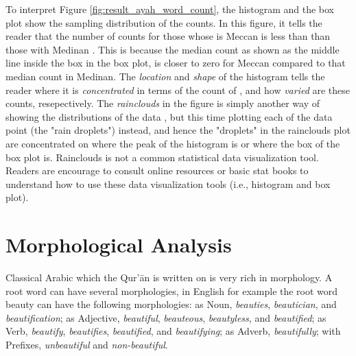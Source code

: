 To interpret Figure \ref{fig:result_ayah_word_count}, the histogram and the box plot show the sampling distribution of the   counts. In this figure, it tells the reader that the number of   counts for those whose   is Meccan is less than than those with Medinan  . This is because the median count as shown as the middle line inside the box in the box plot, is closer to zero for Meccan compared to that median count in Medinan. The \textit{location} and \textit{shape} of the histogram tells the reader where it is \textit{concentrated} in terms of the count of  , and how \textit{varied} are these counts, resepectively. The \textit{rainclouds} in the figure is simply another way of showing the distributions of the data , but this time plotting each of the data point (the "rain droplets") instead, and hence the "droplets" in the rainclouds plot are concentrated on where the peak of the histogram is or where the box of the box plot is. Rainclouds is not a common statistical data visualization tool. Readers are encourage to consult online resources or basic stat books to understand how to use these data visualization tools (i.e., histogram and box plot).

\section{Morphological Analysis} \label{sec:method_morph_analysis}
Classical Arabic which the Qur'\=an is written on is very rich in morphology. A root word can have several morphologies, in English for example the root word beauty can have the following morphologies: as Noun, \textit{beauties}, \textit{beautician}, and \textit{beautification}; as Adjective, \textit{beautiful}, \textit{beauteous}, \textit{beautyless}, and \textit{beautified}; as Verb, \textit{beautify}, \textit{beautifies}, \textit{beautified}, and \textit{beautifying}; as Adverb, \textit{beautifully}; with Prefixes, \textit{unbeautiful} and \textit{non-beautiful}.

